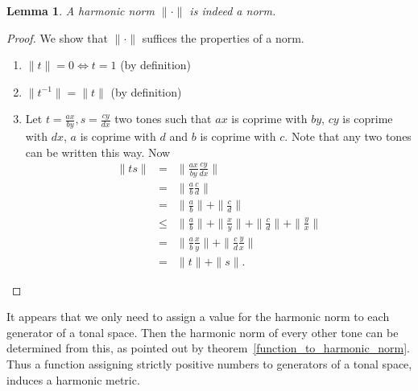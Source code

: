 \documentclass[a4paper]{book}
\newtheorem{lemma}[theorem]{Lemma}
\theoremstyle{definition}
\begin{document}
\begin{lemma}
    A harmonic norm $\| \cdot \|$ is indeed a norm.
\end{lemma}
\begin{proof}
    We show that $\| \cdot \|$ suffices the properties of a norm.
    \begin{enumerate}[i]
        \item $\|t\| = 0 \Leftrightarrow t = 1$ (by definition)
        \item $\|t^{-1}\| = \|t\|$ (by definition)
        \item Let $t = \frac{ax}{by},s = \frac{cy}{dx}$ two tones such that $ax$ is coprime with $by$, $cy$ is coprime with $dx$, $a$ is coprime with $d$ and $b$ is coprime with $c$.
            Note that any two tones can be written this way. 
            Now 
    \begin{eqnarray*}
            \|ts\| &=& \|\frac{ax}{by} \frac{cy}{dx}\|  \\
            &=& \|\frac{a}{b} \frac{c}{d}\| \\
            &=& \|\frac{a}{b}\| + \|\frac{c}{d}\|  \\
            &\leq& \|\frac{a}{b}\| + \|\frac{x}{y}\| + \|\frac{c}{d}\| + \|\frac{y}{x}\|  \\
            &=& \|\frac{a}{b}\frac{x}{y}\| + \|\frac{c}{d}\frac{y}{x}\|  \\
            &=& \|t\| + \|s\|.
    \end{eqnarray*}
    \end{enumerate}
\end{proof}

It appears that we only need to assign a value for the harmonic norm to each generator of a tonal space.
Then the harmonic norm of every other tone can be determined from this, as pointed out by theorem~\ref{function_to_harmonic_norm}.
Thus a function assigning strictly positive numbers to generators of a tonal space, induces a harmonic metric.
\end{document}
